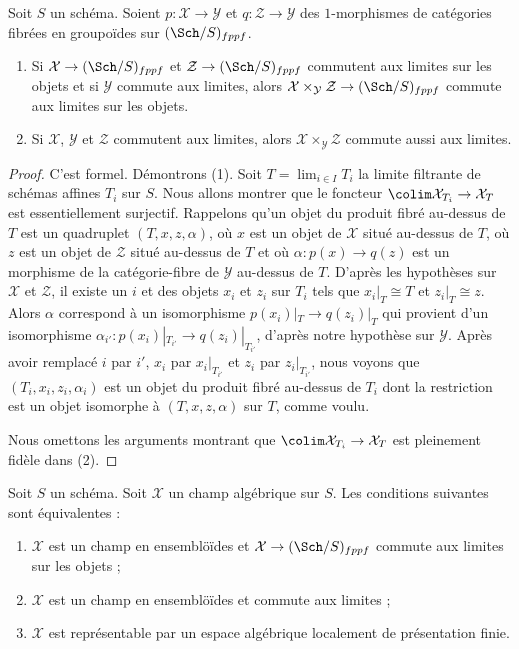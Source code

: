 \begin{lemma}
\label{lemma-fibre-product-limit-preserving}
Soit $S$ un schéma. Soient $p : \mathcal{X} \to \mathcal{Y}$ et
$q : \mathcal{Z} \to \mathcal{Y}$ des $1$-morphismes de catégories fibrées
en groupoïdes sur $(\Sch/S)_{fppf}$.
\begin{enumerate}
\item Si $\mathcal{X} \to (\Sch/S)_{fppf}$ et
$\mathcal{Z} \to (\Sch/S)_{fppf}$ commutent aux limites sur les objets et si
$\mathcal{Y}$ commute aux limites, alors
$\mathcal{X} \times_\mathcal{Y} \mathcal{Z} \to (\Sch/S)_{fppf}$ commute aux
limites sur les objets.
\item Si $\mathcal{X}$, $\mathcal{Y}$ et $\mathcal{Z}$ commutent aux limites,
alors $\mathcal{X} \times_\mathcal{Y} \mathcal{Z}$ commute aussi aux limites.
\end{enumerate}
\end{lemma}

\begin{proof}
C'est formel. Démontrons (1). Soit $T = \lim_{i \in I} T_i$ la limite
filtrante de schémas affines $T_i$ sur $S$. Nous allons montrer que le
foncteur $\colim \mathcal{X}_{T_i} \to \mathcal{X}_T$ est essentiellement
surjectif. Rappelons qu'un objet du produit fibré au-dessus de $T$ est un
quadruplet $(T, x, z, \alpha)$, où $x$ est un objet de $\mathcal{X}$ situé
au-dessus de $T$, où $z$ est un objet de $\mathcal{Z}$ situé au-dessus de $T$
et où $\alpha : p(x) \to q(z)$ est un morphisme de la catégorie-fibre de
$\mathcal{Y}$ au-dessus de $T$. D'après les hypothèses sur $\mathcal{X}$ et
$\mathcal{Z}$, il existe un $i$ et des objets $x_i$ et $z_i$ sur $T_i$ tels
que $x_i|_T \cong T$ et $z_i|_T \cong z$. Alors $\alpha$ correspond à un
isomorphisme $p(x_i)|_T \to q(z_i)|_T$ qui provient d'un isomorphisme
$\alpha_{i'} : p(x_i)|_{T_{i'}} \to q(z_i)|_{T_{i'}}$, d'après notre hypothèse
sur $\mathcal{Y}$. Après avoir remplacé
$i$ par $i'$, $x_i$ par $x_i|_{T_{i'}}$ et $z_i$ par $z_i|_{T_{i'}}$, nous
voyons que $(T_i, x_i, z_i, \alpha_i)$ est un objet du produit fibré au-dessus
de $T_i$ dont la restriction est un objet isomorphe à
$(T, x, z, \alpha)$ sur $T$, comme voulu.

\medskip\noindent
Nous omettons les arguments montrant que
$\colim \mathcal{X}_{T_i} \to \mathcal{X}_T$ est pleinement fidèle dans (2).
\end{proof}

\begin{lemma}
\label{lemma-limit-preserving-algebraic-space}
Soit $S$ un schéma. Soit $\mathcal{X}$ un champ algébrique sur $S$.
Les conditions suivantes sont équivalentes :
\begin{enumerate}
\item $\mathcal{X}$ est un champ en ensemblöïdes et
$\mathcal{X} \to (\Sch/S)_{fppf}$ commute aux limites sur les objets ;
\item $\mathcal{X}$ est un champ en ensemblöïdes et commute aux limites ;
\item $\mathcal{X}$ est représentable par un espace algébrique localement de
présentation finie.
\end{enumerate}
\end{lemma}

